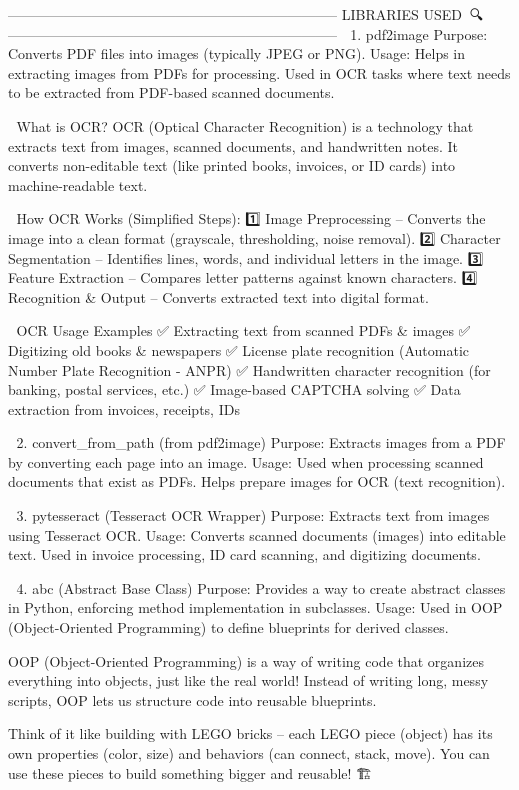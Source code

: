 -----------------------------------------------------------------------
LIBRARIES USED🚀📜🔍
-----------------------------------------------------------------------
📌 1. pdf2image
Purpose: Converts PDF files into images (typically JPEG or PNG).
Usage:
Helps in extracting images from PDFs for processing.
Used in OCR tasks where text needs to be extracted from PDF-based scanned documents.

🔹 What is OCR?
OCR (Optical Character Recognition) is a technology that extracts text from images, scanned documents, and handwritten notes. It converts non-editable text (like printed books, invoices, or ID cards) into machine-readable text.

🔹 How OCR Works (Simplified Steps): 
1️⃣ Image Preprocessing – Converts the image into a clean format (grayscale, thresholding, noise removal).
2️⃣ Character Segmentation – Identifies lines, words, and individual letters in the image.
3️⃣ Feature Extraction – Compares letter patterns against known characters.
4️⃣ Recognition & Output – Converts extracted text into digital format.

📌 OCR Usage Examples
✅ Extracting text from scanned PDFs & images
✅ Digitizing old books & newspapers
✅ License plate recognition (Automatic Number Plate Recognition - ANPR)
✅ Handwritten character recognition (for banking, postal services, etc.)
✅ Image-based CAPTCHA solving
✅ Data extraction from invoices, receipts, IDs

📌 2. convert_from_path (from pdf2image)
Purpose: Extracts images from a PDF by converting each page into an image.
Usage:
Used when processing scanned documents that exist as PDFs.
Helps prepare images for OCR (text recognition).

📌 3. pytesseract (Tesseract OCR Wrapper)
Purpose: Extracts text from images using Tesseract OCR.
Usage:
Converts scanned documents (images) into editable text.
Used in invoice processing, ID card scanning, and digitizing documents.

📌 4. abc (Abstract Base Class)
Purpose: Provides a way to create abstract classes in Python, enforcing method implementation in subclasses.
Usage:
Used in OOP (Object-Oriented Programming) to define blueprints for derived classes.

OOP (Object-Oriented Programming) is a way of writing code that organizes everything into objects, just like the real world! Instead of writing long, messy scripts, OOP lets us structure code into reusable blueprints.

Think of it like building with LEGO bricks – each LEGO piece (object) has its own properties (color, size) and behaviors (can connect, stack, move). You can use these pieces to build something bigger and reusable! 🏗️

